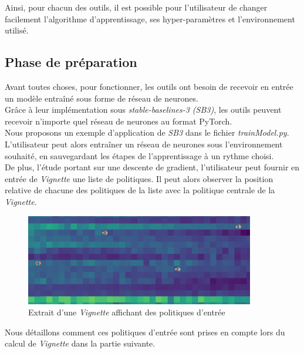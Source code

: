\documentclass[12pt]{article}
\begin{document}
Ainsi, pour chacun des outils, il est possible pour l’utilisateur de changer facilement l’algorithme d’apprentissage, ses hyper-paramètres et l’environnement utilisé. \\

\subsection{Phase de préparation}

Avant toutes choses, pour fonctionner, les outils ont besoin de recevoir en entrée un modèle entraîné sous forme de réseau de neurones. \\

Grâce à leur implémentation sous \emph{stable-baselines-3 (SB3)}, les outils peuvent recevoir n'importe quel réseau de neurones au format PyTorch. \\

Nous proposons un exemple d'application de \emph{SB3} dans le fichier \emph{trainModel.py}. L'utilisateur peut alors entraîner un réseau de neurones sous l'environnement souhaité, en sauvegardant les étapes de l'apprentissage à un rythme choisi. \\

De plus, l'étude portant sur une descente de gradient, l'utilisateur peut fournir en entrée de \emph{Vignette} une liste de politiques. Il peut alors observer la position relative de chacune des politiques de la liste avec la politique centrale de la \emph{Vignette}. \\

\begin{figure}[htp]
    \centering
    \includegraphics[width=10cm]{Images/politiques_entrees_vignette}
    \caption{Extrait d'une \emph{Vignette} affichant des politiques d'entrée}
    \label{fig:exempleEntree}
\end{figure}

Nous détaillons comment ces politiques d'entrée sont prises en compte lors du calcul de \emph{Vignette} dans la partie suivante. \\
\end{document}
